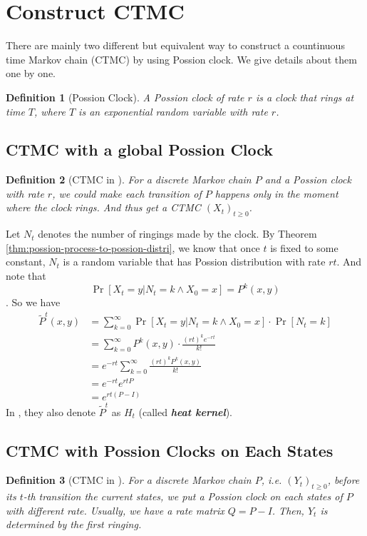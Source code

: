 \documentclass{article}
\newtheorem{define}{Definition}[section]
\begin{document}
\section{Construct CTMC}
There are mainly two different but equivalent way to construct a countinuous time Markov chain (CTMC) by using Possion clock. We give details about them one by one.
\begin{define}[Possion Clock]
  A Possion clock of rate $r$ is a clock that rings at time $T$, where $T$ is an exponential random variable with rate $r$.
\end{define}

\subsection{CTMC with a global Possion Clock}
\begin{define}[CTMC in \cite{levin2017markov}] \label{def:CTMC-LP17}
  For a discrete Markov chain $P$ and a Possion clock with rate $r$, we could make each transition of $P$ happens only in the moment where the clock rings. And thus get a CTMC $(X_t)_{t \geq 0}$.
\end{define}

Let $N_t$ denotes the number of ringings made by the clock.
By Theorem \ref{thm:possion-process-to-possion-distri}, we know that once $t$ is fixed to some constant, $N_t$ is a random variable that has Possion distribution with rate $rt$.
And note that
\[\Pr[X_t = y | N_t = k \land X_0 = x] = P^k(x, y)\].
So we have
\begin{align*}
  \tilde{P}^t(x, y)
  &= \sum_{k=0}^\infty\Pr[X_t = y | N_t = k \land X_0 = x]\cdot\Pr[N_t = k] \\
  &= \sum_{k=0}^\infty P^k(x, y) \cdot \frac{(rt)^ke^{-rt}}{k!} \\
  &= e^{-rt} \sum_{k=0}^\infty \frac{(rt)^kP^k(x,y)}{k!} \\
  &= e^{-rt} e^{rtP} \\
  &= e^{rt(P-I)}
\end{align*}
In \cite{levin2017markov}, they also denote $\tilde{P}^t$ as $H_t$ (called \textbf{\textit{heat kernel}}).

\subsection{CTMC with Possion Clocks on Each States}
\begin{define}[CTMC in \cite{norris1998markov}]
  For a discrete Markov chain $P$, i.e. $(Y_t)_{t\geq 0}$, before its $t$-th transition the current states, we put a Possion clock on each states of $P$ with different rate. Usually, we have a rate matrix $Q = P - I$. Then, $Y_t$ is determined by the first ringing.
\end{define}
\end{document}

